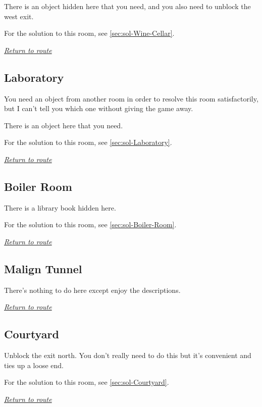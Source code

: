 \documentclass[a5paper]{extarticle}
\begin{document}
There is an object hidden here that you need,
and you also need to unblock the west exit.

For the solution to this room, see \cref{sec:sol-Wine-Cellar}.

\hyperref[sec:route-8]{\emph{Return to route}}

\newpage
\subsection{Laboratory}\label{sec:req-Laboratory}

You need an object from another room in order to resolve this room
satisfactorily, but I can't tell you which one without giving the game away.

There is an object here that you need.

For the solution to this room, see \cref{sec:sol-Laboratory}.

\hyperref[sec:route-8]{\emph{Return to route}}

\newpage
\subsection{Boiler Room}\label{sec:req-Boiler-Room}

There is a library book hidden here.

For the solution to this room, see \cref{sec:sol-Boiler-Room}.

\hyperref[sec:route-8]{\emph{Return to route}}

\newpage
\subsection{Malign Tunnel}\label{sec:req-Malign-Tunnel}

There's nothing to do here except enjoy the descriptions.

\hyperref[sec:route-8]{\emph{Return to route}}

\newpage
\subsection{Courtyard}\label{sec:req-Courtyard}

Unblock the exit north. You don't really need to do this but it's convenient
and ties up a loose end.

For the solution to this room, see \cref{sec:sol-Courtyard}.

\hyperref[sec:route-8]{\emph{Return to route}}
\end{document}

